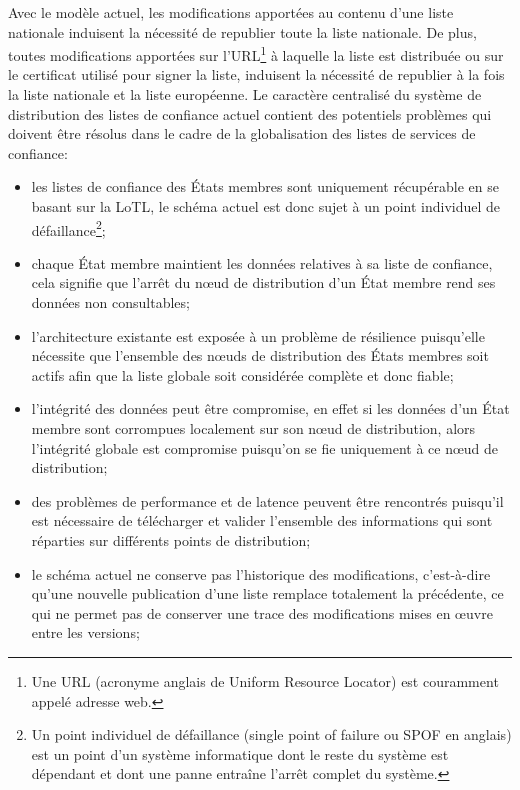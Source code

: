 \documentclass{tnreport}
\begin{document}
Avec le modèle actuel, les modifications apportées au contenu d'une liste nationale induisent la nécessité de republier toute la liste nationale. De plus, toutes modifications apportées sur l'URL\footnote{Une URL (acronyme anglais de Uniform Resource Locator) est couramment appelé adresse web.} à laquelle la liste est distribuée ou sur le certificat utilisé pour signer la liste, induisent la nécessité de republier à la fois la liste nationale et la liste européenne.
Le caractère centralisé du système de distribution des listes de confiance actuel contient des potentiels problèmes qui doivent être résolus dans le cadre de la globalisation des listes de services de confiance:
\begin{itemize}
	\item les listes de confiance des États membres sont uniquement récupérable en se basant sur la LoTL, le schéma actuel est donc sujet à un point individuel de défaillance\footnote{Un point individuel de défaillance (single point of failure ou SPOF en anglais) est un point d'un système informatique dont le reste du système est dépendant et dont une panne entraîne l'arrêt complet du système.};
	\item chaque État membre maintient les données relatives à sa liste de confiance, cela signifie que l'arrêt du nœud de distribution d'un État membre rend ses données non consultables;
	\item l'architecture existante est exposée à un problème de résilience puisqu'elle nécessite que l'ensemble des nœuds de distribution des États membres soit actifs afin que la liste globale soit considérée complète et donc fiable;
	\item l'intégrité des données peut être compromise, en effet si les données d'un État membre sont corrompues localement sur son nœud de distribution, alors l'intégrité globale est compromise puisqu'on se fie uniquement à ce nœud de distribution;
	\item des problèmes de performance et de latence peuvent être rencontrés puisqu'il est nécessaire de télécharger et valider l'ensemble des informations qui sont réparties sur différents points de distribution;
	\item le schéma actuel ne conserve pas l'historique des modifications, c'est-à-dire qu'une nouvelle publication d'une liste remplace totalement la précédente, ce qui ne permet pas de conserver une trace des modifications mises en œuvre entre les versions;
\end{itemize}
\end{document}
